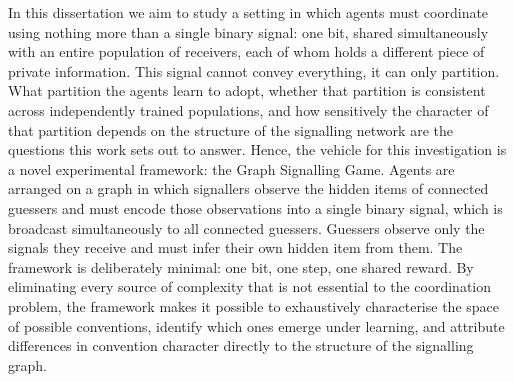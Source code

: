 \documentclass[a4paper,twoside,12pt]{report}
\begin{document}
    In this dissertation we aim to study a
    setting in which agents must coordinate using nothing more than a single binary
    signal: one bit, shared simultaneously with an entire population of receivers,
    each of whom holds a different piece of private information. This signal cannot convey
    everything, it can only partition. What partition the agents learn to adopt,
    whether that partition is consistent across independently trained populations,
    and how sensitively the character of that partition depends on the structure of
    the signalling network are the questions this work sets out to answer. Hence, the vehicle for this investigation is a novel experimental framework: the Graph
    Signalling Game. Agents are arranged on a graph in which signallers observe the
    hidden items of connected guessers and must encode those observations into a
    single binary signal, which is broadcast simultaneously to all connected
    guessers. Guessers observe only the signals they receive and must infer their
    own hidden item from them. The framework is deliberately minimal: one bit, one
    step, one shared reward. By eliminating every source of complexity that is not essential to
    the coordination problem, the framework makes it possible to exhaustively
    characterise the space of possible conventions, identify which ones emerge under
    learning, and attribute differences in convention character directly to the
    structure of the signalling graph.
    
    
    
    
\end{document}
